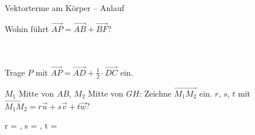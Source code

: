 \begin{aufgabe}{Vektorterme am Körper – Anlauf}
\begin{teile}
\teil Wohin führt $\overrightarrow{AP} = \overrightarrow{AB} + \overrightarrow{BF}$? \\  \\  \\ 

\begin{ksys3}[x1max=7]          \end{ksys3}
\teil Trage $P$ mit $\overrightarrow{AP} = \overrightarrow{AD} + \frac{1}{2} \cdot \overrightarrow{DC}$ ein.

\begin{ksys3}[x1max=7]          \end{ksys3}
\teil $M_1$ Mitte von $AB$, $M_2$ Mitte von $GH$: Zeichne $\overrightarrow{M_1M_2}$ ein. $r$, $s$, $t$ mit $\overrightarrow{M_1M_2} = r\vec u + s\vec v + t\vec w$?

\begin{ksys3}[x1max=7]             \end{ksys3}
r = \leerfeld , s = \leerfeld , t = \leerfeld
\end{teile}
\end{aufgabe}


